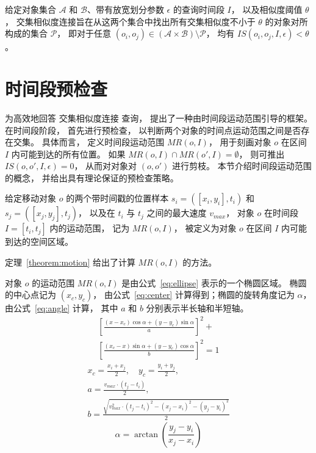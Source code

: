 \begin{definition}[交集相似度连接问题]\label{defi:Tb-IS-Join}
给定对象集合 $\mathcal{A}$ 和 $\mathcal{B}$、带有放宽划分参数 $\epsilon$ 的查询时间段 $I$， 以及相似度阈值 $\theta$， 交集相似度连接旨在从这两个集合中找出所有交集相似度不小于 $\theta$ 的对象对所构成的集合 $\mathcal{P}$， 即对于任意 $(o_i,o_j)\in (\mathcal{A}\times \mathcal{B})\setminus \mathcal{P}$， 均有
$IS(o_i,o_j,I,\epsilon)<\theta$。
\end{definition}


\section{时间段预检查}
为高效地回答 交集相似度连接 查询， 提出了一种由时间段运动范围引导的框架。 在时间段阶段， 首先进行预检查， 以判断两个对象的时间点运动范围之间是否存在交集。 具体而言， 定义时间段运动范围 $MR(o,I)$， 用于刻画对象 $o$ 在区间 $I$ 内可能到达的所有位置。 如果 $MR(o, I)\cap MR(o', I)=\emptyset$， 则可推出 $IS(o,o',I,\epsilon)=0$， 从而对对象对 $(o,o')$ 进行剪枝。
本节介绍时间段运动范围的概念， 并给出具有理论保证的预检查策略。

\begin{definition}[时间段运动范围]\label{defi:interval motion}
给定移动对象 $o$ 的两个带时间戳的位置样本 $s_i = ([x_i, y_i], t_i)$ 和 $s_{j}=([x_j,y_j], t_j)$， 以及在 $t_i$ 与 $t_j$ 之间的最大速度 $v_{max}$， 对象 $o$ 在时间段 $I=[t_i,t_j]$ 内的运动范围， 记为 $MR(o,I)$， 被定义为对象 $o$ 在区间 $I$ 内可能到达的空间区域。
\end{definition}

定理~\ref{theorem:motion} 给出了计算 $MR(o,I)$ 的方法。

\begin{theorem}\label{theorem:motion}
对象 $o$ 的运动范围 $MR(o,I)$ 是由公式~\eqref{eq:ellipse} 表示的一个椭圆区域。 椭圆的中心点记为 $(x_c, y_c)$， 由公式~\eqref{eq:center} 计算得到；椭圆的旋转角度记为 $\alpha$， 由公式~\eqref{eq:angle} 计算， 其中 $a$ 和 $b$ 分别表示半长轴和半短轴。
\begin{equation}
    \label{eq:ellipse}
    \begin{aligned}
 \left[\frac{(x-x_c)\cos\alpha+(y-y_c)\sin\alpha}{a}\right]^2+\\
    \left[\frac{(x_c-x)\sin\alpha+(y-y_c)\cos\alpha}{b}\right]^2 = 1
    \end{aligned}
\end{equation}
\begin{equation}
    \label{eq:center}
    \begin{aligned}
    x_c = \frac{x_i+x_{j}}{2}, \quad y_c=\frac{y_i+y_{j}}{2},\\
    a = \frac{v_{max}\cdot (t_{j}-t_i)}{2}, \\
    b=\frac{\sqrt{v_{max}^2\cdot (t_{j}-t_i)^2-(x_{j}-x_i)^2-(y_{j}-y_i)^2}}{2}
    \end{aligned}
\end{equation}
\begin{equation}
\label{eq:angle}
    \alpha = \arctan\!\left(\frac{y_{j}-y_i}{x_{j}-x_i}\right)
\end{equation}
\end{theorem}

